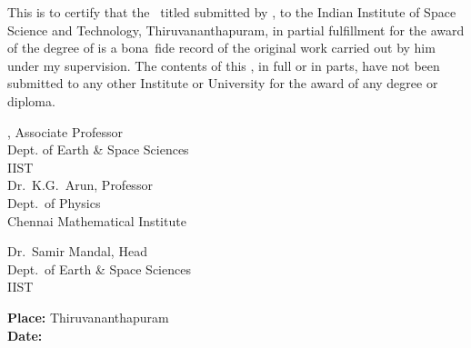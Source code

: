 This is to certify that the \Doctype\ titled \textbf{\textit{\Title}} submitted by
{\bf\Author}, to the Indian Institute of Space Science and Technology,
Thiruvananthapuram, in partial fulfillment for the award of the degree of
{\bf\Degreetext} is a
bona~fide record of the original work carried out by him under my supervision. The
contents of this \Doctype, in full or in parts, have not been submitted to any other
Institute or University for the award of any degree or diploma.

\vspace{30mm}
\noindent
\begin{minipage}{0.5\textwidth}
    \Advisor, Associate Professor\\
    Dept. of Earth \& Space Sciences\\
    IIST\\

    Dr.\ K.G.\ Arun, Professor\\
    Dept.\ of Physics\\
    Chennai Mathematical Institute
\end{minipage}
\hspace{2cm}
\begin{minipage}{0.5\textwidth}
    Dr.\ Samir Mandal, Head\\
    Dept.\ of Earth \& Space Sciences\\
    IIST
\end{minipage}

\vspace{20mm}
\noindent
\textbf{Place: }Thiruvananthapuram\\
\textbf{Date: \ }\Date
